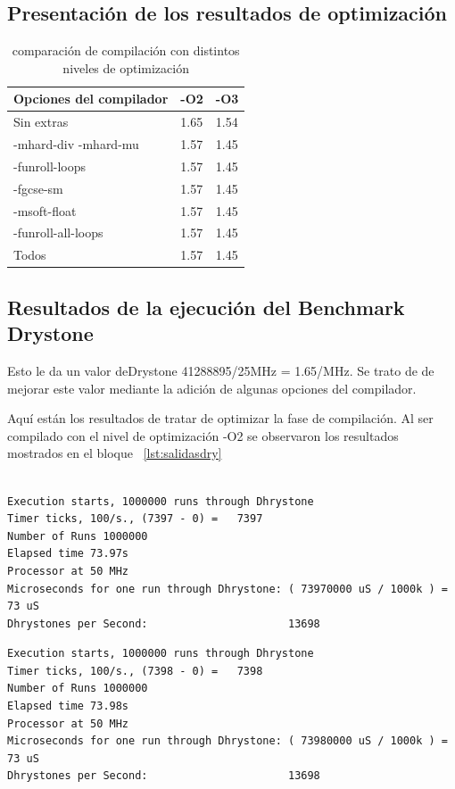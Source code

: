 	\subsection {Presentación de los resultados de optimización} 
\begin{table}[!h]
\begin{center}
\begin{tabular}{ |l |l| l|}
\hline
\rowcolor[gray]{0.8} Opciones del compilador&-O2&-O3 \\
\hline
Sin extras 					&1.65 			&1.54\\
\hline
-mhard-div -mhard-mu 	& 1.57			&1.45 \\
\hline
-funroll-loops			 	& 1.57			& 1.45 \\
\hline
-fgcse-sm					& 1.57			& 1.45 \\
\hline
-msoft-float 				& 1.57			&1.45  \\
\hline
-funroll-all-loops	 		& 1.57			& 1.45 \\
\hline
Todos	 					& 1.57			& 1.45 \\
\hline
\end{tabular}
\end{center}
\caption{comparación de compilación con distintos niveles de optimización}
\end{table}
\newpage
		\subsection{Resultados de la ejecución del Benchmark Drystone}

Esto le da un valor deDrystone 41288895/25MHz = 1.65/MHz. Se trato de de mejorar este valor mediante la adición de algunas opciones del compilador.

Aquí están los resultados de tratar de optimizar la fase de compilación. Al ser compilado con el nivel de optimización -O2 se observaron los resultados mostrados en el bloque ~\ref{lst:salidasdry} 

\begin{lstlisting}[frame=single,caption={Sin optimizaciones },label={lst:salidas},breaklines]

Execution starts, 1000000 runs through Dhrystone
Timer ticks, 100/s., (7397 - 0) =	7397
Number of Runs 1000000
Elapsed time 73.97s
Processor at 50 MHz
Microseconds for one run through Dhrystone: ( 73970000 uS / 1000k ) = 73 uS
Dhrystones per Second:                      13698 
\end{lstlisting}

\begin{lstlisting}[frame=single,caption={Optimización nivel -O2},label={lst:salidas},breaklines]
Execution starts, 1000000 runs through Dhrystone
Timer ticks, 100/s., (7398 - 0) =	7398
Number of Runs 1000000
Elapsed time 73.98s
Processor at 50 MHz
Microseconds for one run through Dhrystone: ( 73980000 uS / 1000k ) = 73 uS
Dhrystones per Second:                      13698 
\end{lstlisting}

